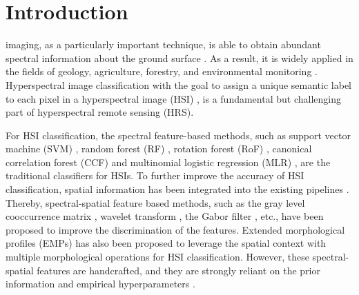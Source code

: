 \documentclass[journal]{IEEEtran}
\begin{document}
\IEEEpeerreviewmaketitle



\section{Introduction}
\label{sec:intro}
 imaging, as a particularly important technique, is able to obtain abundant spectral information about the ground surface \cite{ghamisi2018new,zhong2018mini, li2019deep}.
As a result, it is widely applied in the fields of geology, agriculture, forestry, and environmental monitoring \cite{govender2007review, adam2010multispectral,koch2010status}.
Hyperspectral image classification with the goal to assign a unique semantic label to each pixel in a hyperspectral image (HSI) \cite{camps2014advances}, is a fundamental but challenging part of hyperspectral remote sensing (HRS).


For HSI classification, the spectral feature-based methods, such as support vector machine (SVM) \cite{melgani2004classification}, random forest (RF) \cite{gislason2006random},  rotation forest (RoF) \cite{xia2013hyperspectral},  canonical correlation forest (CCF) \cite{rainforth2015canonical, xia2016hyperspectral} and multinomial logistic regression (MLR) \cite{krishnapuram2005sparse}, are the traditional classifiers for HSIs.
To further improve the accuracy of HSI classification, spatial information has been integrated into the existing pipelines \cite{fauvel2007spectral, tarabalka2009spectral, li2012spectral}.
Thereby, spectral-spatial feature based methods, such as the gray level cooccurrence matrix \cite{pesaresi2008robust}, wavelet transform \cite{zhu1998study}, the Gabor filter \cite{li2014gabor}, etc., have been proposed to improve the discrimination of the features.
Extended morphological profiles (EMPs) \cite{benediktsson2005classification, li2013generalized} has also been proposed to leverage the spatial context with multiple morphological operations for HSI classification.
However, these spectral-spatial features are handcrafted, and they are strongly reliant on the prior information and empirical hyperparameters \cite{chen2014deep, xu2018spectral}.
\end{document}

